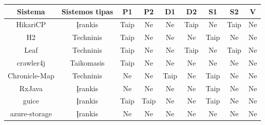 \begin{figure}[H]
    \begin{tabular}{|c|c|c|c|c|c|c|c|c|}
        \hline
        Sistema                         & Sistemos tipas & P1 & P2 & D1 & D2 & S1 & S2 & V \\ \hline \hline
        HikariCP                        & Įrankis                   & Taip                          & Ne                            & Ne                         & Taip                       & Ne                 & Taip               & Ne                  \\ \hline
        H2                              & Techninis                 & Taip                          & Ne                            & Ne                         & Ne                         & Taip               & Ne                 & Ne                  \\ \hline
        Leaf                            & Techninis                 & Taip                          & Ne                            & Ne                         & Taip                       & Ne                 & Taip               & Ne                  \\ \hline
        crawler4j                       & Taikomasis                & Taip                          & Ne                            & Ne                         & Ne                         & Ne                 & Ne                 & Ne                  \\ \hline
        Chronicle-Map                   & Techninis                 & Ne                            & Ne                            & Taip                       & Ne                         & Taip               & Ne                 & Ne                  \\ \hline
        RxJava                          & Įrankis                   & Ne                            & Ne                            & Ne                         & Ne                         & Taip               & Ne                 & Ne                  \\ \hline
        guice                           & Įrankis                   & Taip                          & Taip                          & Ne                         & Ne                         & Taip               & Ne                 & Ne                  \\ \hline
        azure-storage                   & Įrankis                   & Ne                            & Ne                            & Ne                         & Ne                         & Ne                 & Ne                 & Ne                  \\ \hline

\end{tabular}
\end{figure}
